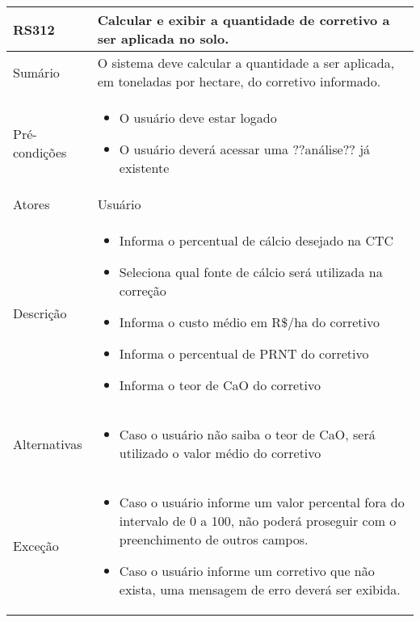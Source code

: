 \begin{quadro}[!htb]
    \begin{tabular}{|p{3cm}|p{11cm}|}
        \hline
        \textbf{RS312} & \textbf{Calcular e exibir a quantidade de corretivo a ser aplicada no solo.} \\
        \hline
        Sumário        & O sistema deve calcular a quantidade a ser aplicada, em toneladas por hectare, do corretivo informado.                  \\
        \hline
        Pré-condições  & \begin{itemize}
            \item O usuário deve estar logado
            \item O usuário deverá acessar uma ??análise?? já existente 
        \end{itemize}                 \\
        \hline
        Atores         & Usuário                  \\
        \hline
        Descrição      &
        \begin{itemize}
            \item Informa o percentual de cálcio desejado na CTC
            \item Seleciona qual fonte de cálcio será utilizada na correção
            \item Informa o custo médio em R\$/ha do corretivo
            \item Informa o percentual de PRNT do corretivo
            \item Informa o teor de CaO do corretivo
        \end{itemize}                 \\
        \hline
        Alternativas   &
        \begin{itemize}
            \item Caso o usuário não saiba o teor de CaO, será utilizado o valor médio do corretivo
        \end{itemize}                 \\
        \hline
        Exceção        &
        \begin{itemize}
            \item Caso o usuário informe um valor percental fora do intervalo de 0 a 100, não poderá proseguir com o preenchimento de outros campos.
            \item Caso o usuário informe um corretivo que não exista, uma mensagem de erro deverá ser exibida.
        \end{itemize}                   \\
        \hline
    \end{tabular}
\end{quadro}

